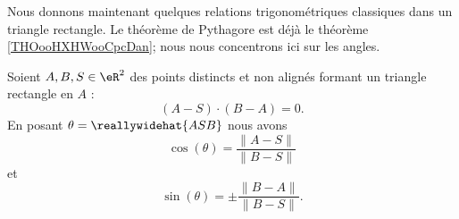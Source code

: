 Nous donnons maintenant quelques relations trigonométriques classiques dans un triangle rectangle. Le théorème de Pythagore est déjà le théorème \ref{THOooHXHWooCpcDan}; nous nous concentrons ici sur les angles.

\begin{proposition}     \label{PROPooCDZVooKOQzct}
	Soient \( A,B,S\in \eR^2\) des points distincts et non alignés formant un triangle rectangle en \( A\) :
	\begin{equation}
		(A-S)\cdot (B-A)=0.
	\end{equation}
	En posant \( \theta=\reallywidehat{ASB}\) nous avons
	\begin{equation}
		\cos(\theta)=\frac{ \| A-S \| }{ \| B-S \| }
	\end{equation}
	et
	\begin{equation}        \label{EQooEKZEooFeNImX}
		\sin(\theta)=\pm\frac{ \| B-A \| }{ \| B-S \| }.
	\end{equation}

\end{proposition}

